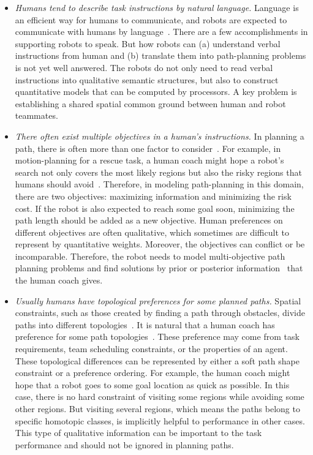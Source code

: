 \documentclass[phd]{byuprop}
\begin{document}
\begin{itemize}

\item {\em Humans tend to describe task instructions by natural language.}
Language is an efficient way for humans to communicate, and robots are expected to communicate with humans by language~\cite{Kollar:2010:TUN:1734454.1734553,howard2014natural}. 
There are a few accomplishments in supporting robots to speak.
But how robots can (a) understand verbal instructions from human and (b) translate them into path-planning problems is not yet well answered. 
The robots do not only need to read verbal instructions into qualitative semantic structures, but also to construct quantitative models that can be computed by processors.
A key problem is establishing a shared spatial common ground between human and robot teammates.

\item {\em There often exist multiple objectives in a human's instructions.}
In planning a path, there is often more than one factor to consider~\cite{Ahmed2013}.
For example, in motion-planning for a rescue task, a human coach might hope a robot's search not only covers the most likely regions but also the risky regions that humans should avoid~\cite{Yi2014}.
Therefore, in modeling path-planning in this domain, there are two objectives: maximizing information and minimizing the risk cost.
If the robot is also expected to reach some goal soon, minimizing the path length should be added as a new objective.
Human preferences on different objectives are often qualitative, which sometimes are difficult to represent by quantitative weights.
Moreover, the objectives can conflict or be incomparable.
Therefore, the robot needs to model multi-objective path planning problems and find solutions by prior or posterior information~\cite{Miettinen1999} that the human coach gives.

\item {\em Usually humans have topological preferences for some planned paths.}
Spatial constraints, such as those created by finding a path through obstacles, divide paths into different topologies~\cite{Bhattachary2010}.
It is natural that a human coach has preference for some path topologies~\cite{Yi2014}.
These preference may come from task requirements, team scheduling constraints, or the properties of an agent.
These topological differences can be represented by either a soft path shape constraint or a preference ordering.
For example, the human coach might hope that a robot goes to some goal location as quick as possible.
In this case, there is no hard constraint of visiting some regions while avoiding some other regions.
But visiting several regions, which means the paths belong to specific homotopic classes, is implicitly helpful to performance in other cases.
This type of qualitative information can be important to the task performance and should not be ignored in planning paths.

\end{itemize} 
\end{document}
